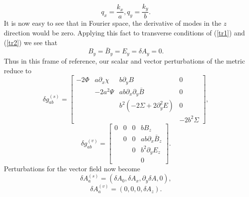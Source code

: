 \documentclass[%
 reprint,
 amsmath,amssymb,
 aps,
]{revtex4-1}
\begin{document}
\begin{equation}
q_x=\frac{k_x}{a},q_y=\frac{k_y}{b}.
\end{equation}
It is now easy to see that in Fourier space, the derivative of modes in the $z$ direction would be zero. Applying this fact to transverse conditions of (\ref{tr1}) and (\ref{tr2}) we see that
\begin{equation}
B_y=\bar{B}_y=E_y=\delta A_y=0.
\end{equation}
Thus in this frame of reference, our scalar and vector perturbations of the metric reduce to
\begin{equation}
\delta g_{ab}^{(s)}=
\begin{bmatrix}
-2\Phi       & a\partial_x\chi   &b\partial_yB                   &0 \\
             & -2a^2\Psi         &ab\partial_x\partial_y\bar{B}         &0 \\
             &                   & b^2(-2\Sigma+2\partial_y^2E)  &0 \\
             &                   &                               &-2b^2\Sigma
\end{bmatrix},
\end{equation}
\begin{equation}
\delta g_{ab}^{(v)}=
\begin{bmatrix}
0      & 0    & 0    &bB_z \\
       & 0    & 0    &ab\partial_x\bar{B}_z \\
       &      & 0    &b^2\partial_y E_z \\
       &      &      &0
\end{bmatrix}.
\end{equation}
Perturbations for the vector field now become
\begin{equation}
\delta A_a^{(s)}=(\delta A_0,\delta A_x,\partial_y \delta A,0),
\end{equation}
\begin{equation}\label{vecvecper}
\delta A_a^{(v)}=(0,0,0,\delta A_z).
\end{equation}
\end{document}
